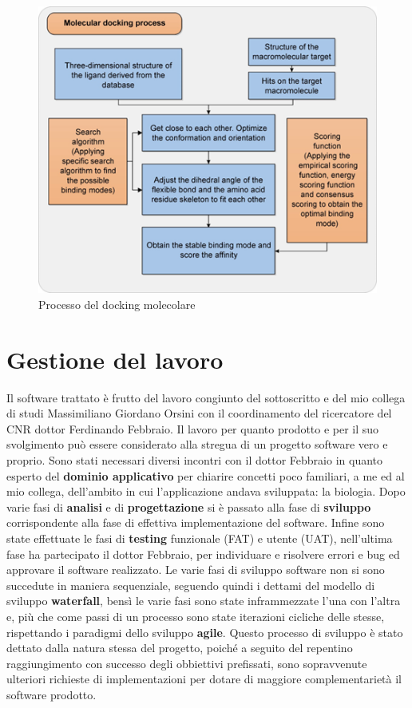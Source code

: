 \begin{figure}[H]
    \centering
    \includegraphics{immagini/capitolo1/processoDockingMolecolare.png}
    \caption{Processo del docking molecolare}
    \label{fig:processo del docking Molecolare}
\end{figure}

\section{Gestione del lavoro}
Il software trattato è frutto del lavoro congiunto del sottoscritto e del mio collega di studi Massimiliano Giordano Orsini con il coordinamento del ricercatore del CNR dottor Ferdinando Febbraio. Il lavoro per quanto prodotto e per il suo svolgimento può essere considerato alla stregua di un progetto software vero e proprio. Sono stati necessari diversi incontri con il dottor Febbraio in quanto esperto del \textbf{dominio applicativo} per chiarire concetti poco familiari, a me ed al mio collega, dell'ambito in cui l'applicazione andava sviluppata: la biologia.\newline 
Dopo varie fasi di \textbf{analisi} e di \textbf{progettazione} si è passato alla fase di \textbf{sviluppo} corrispondente alla fase di effettiva implementazione del software. Infine sono state effettuate le fasi di \textbf{testing} funzionale (FAT) e utente (UAT), nell'ultima fase ha partecipato il dottor Febbraio, per individuare e risolvere errori e bug ed approvare il software realizzato. Le varie fasi di sviluppo software non si sono succedute in maniera sequenziale, seguendo quindi i dettami del modello di sviluppo \textbf{waterfall}, bensì le varie fasi sono state inframmezzate l'una con l'altra e, più che come passi di un processo sono state iterazioni cicliche delle stesse, rispettando i paradigmi dello sviluppo \textbf{agile}.\newline
Questo processo di sviluppo è stato dettato dalla natura stessa del progetto, poiché a seguito del repentino raggiungimento con successo degli obbiettivi prefissati, sono sopravvenute ulteriori richieste di implementazioni per dotare di maggiore complementarietà il software prodotto.

